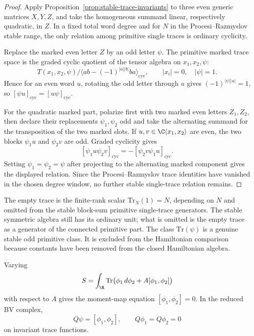 \documentclass[11pt]{memoir}
\begin{document}
\begin{proof}
  Apply Proposition~\ref{prop:stable-trace-invariants} to three even
  generic matrices \(X,Y,Z\), and take the homogeneous summand linear,
  respectively quadratic, in \(Z\).  In a fixed total word degree and for
  \(N\) in the Procesi--Razmyslov stable range, the only relation among
  primitive single traces is ordinary cyclicity.

  Replace the marked even letter \(Z\) by an odd letter \(\psi\).  The
  primitive marked trace space is the graded cyclic quotient of the
  tensor algebra on \(x_1,x_2,\psi\):
  \[
    T(x_1,x_2,\psi)\big/
    \langle ab-(-1)^{|a||b|}ba\rangle_{\mathrm{cyc}},
    \qquad |x_i|=0,\quad |\psi|=1 .
  \]
  Hence for an even word \(u\), rotating the odd letter through \(u\)
  gives \((-1)^{|\psi||u|}=1\), so
  \([\psi u]_{\mathrm{cyc}}=[u\psi]_{\mathrm{cyc}}\).

  For the quadratic marked part, polarize first with two marked even
  letters \(Z_1,Z_2\), then declare their replacements
  \(\psi_1,\psi_2\) odd and take the alternating summand for the
  transposition of the two marked slots.  If
  \(u,v\in\C\langle x_1,x_2\rangle\) are even, the two blocks
  \(\psi_1u\) and \(\psi_2v\) are odd.  Graded cyclicity gives
  \[
    [\psi_1u\psi_2v]_{\mathrm{cyc}}
      =
    -[\psi_2v\psi_1u]_{\mathrm{cyc}} .
  \]
  Setting \(\psi_1=\psi_2=\psi\) after projecting to the alternating
  marked component gives the displayed relation.  Since the
  Procesi--Razmyslov trace identities have vanished in the chosen
  degree window, no further stable single-trace relation remains.
\end{proof}

\begin{rmk}
  The empty trace is the finite-rank scalar $\mathrm{Tr}_N(1)=N$, depending
  on $N$ and omitted from the stable block-sum primitive single-trace
  generators. The stable
  symmetric algebra still has its ordinary unit; what is omitted is the empty
  trace as a generator of the connected primitive part. The class
  $\mathrm{Tr}(\psi)$ is a genuine stable odd primitive class. It is excluded
  from the Hamiltonian comparison because constants have been removed from the
  closed Hamiltonian algebra.
\end{rmk}

Varying
$$S=\int_\R\mathrm{Tr}\bigl(\phi_1\,d\phi_2+A[\phi_1,\phi_2]\bigr)$$
with respect to $A$ gives the moment-map equation
$[\phi_1,\phi_2]=0$. In the reduced BV complex,
$$Q\psi=[\phi_1,\phi_2],\qquad Q\phi_1=Q\phi_2=0$$
on invariant trace functions.
\end{document}
